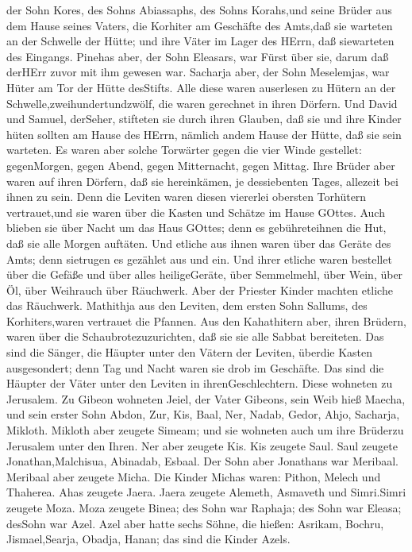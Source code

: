 der Sohn Kores, des Sohns Abiassaphs, des Sohns Korahs,und seine Brüder
aus dem Hause seines Vaters, die Korhiter am Geschäfte des Amts,daß sie
warteten an der Schwelle der Hütte; und ihre Väter im Lager des HErrn,
daß siewarteten des Eingangs.  Pinehas aber, der Sohn
Eleasars, war Fürst über sie, darum daß derHErr zuvor mit ihm gewesen
war.  Sacharja aber, der Sohn Meselemjas, war Hüter am Tor
der Hütte desStifts.  Alle diese waren auserlesen zu Hütern
an der Schwelle,zweihundertundzwölf, die waren gerechnet in ihren
Dörfern. Und David und Samuel, derSeher, stifteten sie durch ihren
Glauben,  daß sie und ihre Kinder hüten sollten am Hause
des HErrn, nämlich andem Hause der Hütte, daß sie sein warteten.
 Es waren aber solche Torwärter gegen die vier Winde
gestellet: gegenMorgen, gegen Abend, gegen Mitternacht, gegen Mittag.
 Ihre Brüder aber waren auf ihren Dörfern, daß sie
hereinkämen, je dessiebenten Tages, allezeit bei ihnen zu sein.
 Denn die Leviten waren diesen viererlei obersten Torhütern
vertrauet,und sie waren über die Kasten und Schätze im Hause GOttes.
 Auch blieben sie über Nacht um das Haus GOttes; denn es
gebühreteihnen die Hut, daß sie alle Morgen auftäten.  Und
etliche aus ihnen waren über das Geräte des Amts; denn sietrugen es
gezählet aus und ein.  Und ihrer etliche waren bestellet
über die Gefäße und über alles heiligeGeräte, über Semmelmehl, über
Wein, über Öl, über Weihrauch über Räuchwerk.  Aber der
Priester Kinder machten etliche das Räuchwerk.  Mathithja
aus den Leviten, dem ersten Sohn Sallums, des Korhiters,waren vertrauet
die Pfannen.  Aus den Kahathitern aber, ihren Brüdern,
waren über die Schaubrotezuzurichten, daß sie sie alle Sabbat
bereiteten.  Das sind die Sänger, die Häupter unter den
Vätern der Leviten, überdie Kasten ausgesondert; denn Tag und Nacht
waren sie drob im Geschäfte.  Das sind die Häupter der
Väter unter den Leviten in ihrenGeschlechtern. Diese wohneten zu
Jerusalem.  Zu Gibeon wohneten Jeiel, der Vater Gibeons,
sein Weib hieß Maecha,  und sein erster Sohn Abdon, Zur,
Kis, Baal, Ner, Nadab,  Gedor, Ahjo, Sacharja, Mikloth.
 Mikloth aber zeugete Simeam; und sie wohneten auch um ihre
Brüderzu Jerusalem unter den Ihren.  Ner aber zeugete Kis.
Kis zeugete Saul. Saul zeugete Jonathan,Malchisua, Abinadab, Esbaal.
 Der Sohn aber Jonathans war Meribaal. Meribaal aber
zeugete Micha.  Die Kinder Michas waren: Pithon, Melech und
Thaherea.  Ahas zeugete Jaera. Jaera zeugete Alemeth,
Asmaveth und Simri.Simri zeugete Moza.  Moza zeugete Binea;
des Sohn war Raphaja; des Sohn war Eleasa; desSohn war Azel.
 Azel aber hatte sechs Söhne, die hießen: Asrikam, Bochru,
Jismael,Searja, Obadja, Hanan; das sind die Kinder Azels.

